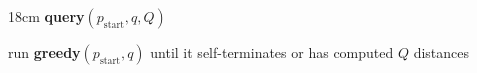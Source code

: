 \documentclass[border=8pt]{standalone}
\begin{document}
\begin{varwidth}{18cm}
{\bfseries query}$(p_{\mathrm{start}}, q, Q)$\par\smallskip
\begin{algorithm}[H]
\DontPrintSemicolon
run {\bfseries greedy}$(p_{\mathrm{start}}, q)$ until it self-terminates or has computed $Q$ distances\;
\end{algorithm}
\end{varwidth}
\end{document}
